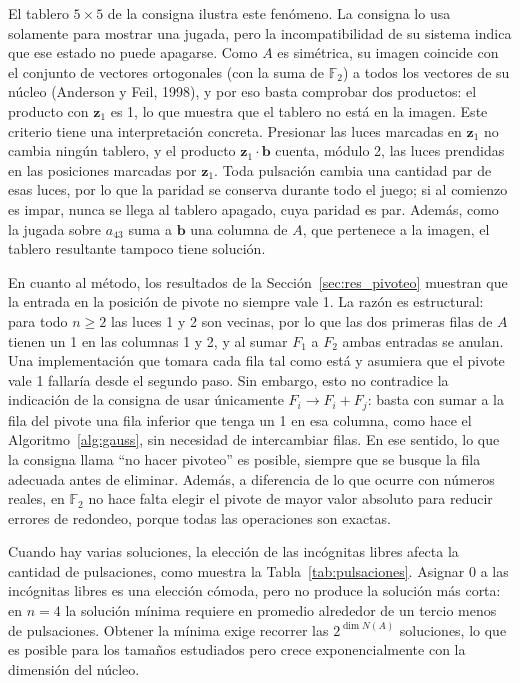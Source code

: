 \documentclass[12pt,a4paper]{article}
\theoremstyle{plain}
\theoremstyle{definition}
\theoremstyle{remark}
\newcommand{\F}{\mathbb{F}_2}
\begin{document}
El tablero $5\times 5$ de la consigna ilustra este fenómeno. La consigna lo usa solamente para mostrar una jugada, pero la incompatibilidad de su sistema indica que ese estado no puede apagarse. Como $A$ es simétrica, su imagen coincide con el conjunto de vectores ortogonales (con la suma de $\F$) a todos los vectores de su núcleo (Anderson y Feil, 1998), y por eso basta comprobar dos productos: el producto con $\mathbf{z}_1$ es 1, lo que muestra que el tablero no está en la imagen. Este criterio tiene una interpretación concreta. Presionar las luces marcadas en $\mathbf{z}_1$ no cambia ningún tablero, y el producto $\mathbf{z}_1\cdot\mathbf{b}$ cuenta, módulo 2, las luces prendidas en las posiciones marcadas por $\mathbf{z}_1$. Toda pulsación cambia una cantidad par de esas luces, por lo que la paridad se conserva durante todo el juego; si al comienzo es impar, nunca se llega al tablero apagado, cuya paridad es par. Además, como la jugada sobre $a_{43}$ suma a $\mathbf{b}$ una columna de $A$, que pertenece a la imagen, el tablero resultante tampoco tiene solución.

En cuanto al método, los resultados de la Sección~\ref{sec:res_pivoteo} muestran que la entrada en la posición de pivote no siempre vale 1. La razón es estructural: para todo $n\geq 2$ las luces 1 y 2 son vecinas, por lo que las dos primeras filas de $A$ tienen un 1 en las columnas 1 y 2, y al sumar $F_1$ a $F_2$ ambas entradas se anulan. Una implementación que tomara cada fila tal como está y asumiera que el pivote vale 1 fallaría desde el segundo paso. Sin embargo, esto no contradice la indicación de la consigna de usar únicamente $F_i\to F_i+F_j$: basta con sumar a la fila del pivote una fila inferior que tenga un 1 en esa columna, como hace el Algoritmo~\ref{alg:gauss}, sin necesidad de intercambiar filas. En ese sentido, lo que la consigna llama ``no hacer pivoteo'' es posible, siempre que se busque la fila adecuada antes de eliminar. Además, a diferencia de lo que ocurre con números reales, en $\F$ no hace falta elegir el pivote de mayor valor absoluto para reducir errores de redondeo, porque todas las operaciones son exactas.

Cuando hay varias soluciones, la elección de las incógnitas libres afecta la cantidad de pulsaciones, como muestra la Tabla~\ref{tab:pulsaciones}. Asignar 0 a las incógnitas libres es una elección cómoda, pero no produce la solución más corta: en $n=4$ la solución mínima requiere en promedio alrededor de un tercio menos de pulsaciones. Obtener la mínima exige recorrer las $2^{\dim N(A)}$ soluciones, lo que es posible para los tamaños estudiados pero crece exponencialmente con la dimensión del núcleo.
\end{document}
